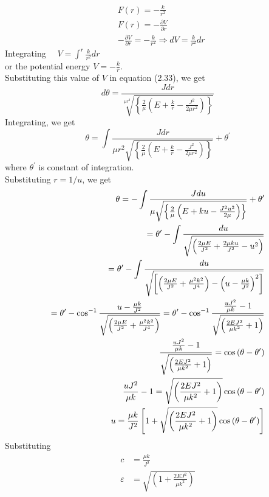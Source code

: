 \begin{align*}
&F(r)=-\frac{k}{r^{2}} \\
&F(r)=-\frac{\partial V}{\partial r} \\
&-\frac{\partial V}{\partial r}=-\frac{k}{r^{2}} \Rightarrow d V=\frac{k}{r^{2}} d r
\end{align*}
Integrating $\quad V=\int^{r} \frac{k}{r^{2}} d r$\\
or the potential energy $V=-\frac{k}{r}$.\\
Substituting this value of $V$ in equation (2.33), we get
$$
d \theta=\frac{J d r}{\sqrt[\mu r^{2}]{\left\{\frac{2}{\mu}\left(E+\frac{k}{r}-\frac{J^{2}}{2 \mu r^{2}}\right)\right\}}}
$$
Integrating, we get
$$
\theta=\int \frac{J d r}{\mu r^{2} \sqrt{\left\{\frac{2}{\mu}\left(E+\frac{k}{r}-\frac{J^{2}}{2 \mu r^{2}}\right)\right\}}}+\theta^{\prime}
$$
where $\theta^{\prime}$ is constant of integration.\\
Substituting $r=1 / u$, we get\\
\begin{align}
\theta=-\int \frac{J d u}{\mu \sqrt{\left\{\frac{2}{\mu}\left(E+k u-\frac{J^{2} u^{2}}{2 \mu}\right)\right\}}}+\theta^{\prime} \notag \\
=\theta^{\prime}-\int \frac{d u}{\sqrt{\left(\frac{2 \mu E}{J^{2}}+\frac{2 \mu k u}{J^{2}}-u^{2}\right)}} \notag \\
=\theta^{\prime}-\int \frac{d u}{\sqrt{\left[\left(\frac{2 \mu E}{J^{2}}+\frac{\mu^{2} k^{2}}{J^{4}}\right)-\left(u-\frac{\mu k}{J^{2}}\right)^{2}\right]}} \notag\\
=\theta^{\prime}-\cos ^{-1} \frac{u-\frac{\mu k}{J^{2}}}{\sqrt{\left(\frac{2 \mu E}{J^{2}}+\frac{\mu^{2} k^{2}}{J^{4}}\right)}}=\theta^{\prime}-\cos ^{-1} \frac{\frac{u J^{2}}{\mu k}-1}{\sqrt{\left(\frac{2 E J^{2}}{\mu k^{2}}+1\right)}} \notag\\
\frac{\frac{u J^{2}}{\mu k}-1}{\sqrt{\left(\frac{2 E J^{2}}{\mu k^{2}}+1\right)}}=\cos \left(\theta-\theta^{\prime}\right)\notag\\
\frac{u J^{2}}{\mu k}-1=\sqrt{\left(\frac{2 E J^{2}}{\mu k^{2}}+1\right)} \cos \left(\theta-\theta^{\prime}\right) \notag \\
u=\frac{\mu k}{J^{2}}\left[1+\sqrt{\left(\frac{2 E J^{2}}{\mu k^{2}}+1\right)} \cos \left(\theta-\theta^{\prime}\right)\right]
\end{align}
Substituting
\begin{align}
c &=\frac{\mu k}{J^{2}} \\
\varepsilon &=\sqrt{\left(1+\frac{2 E J^{2}}{\mu k^{2}}\right)}
\end{align}
